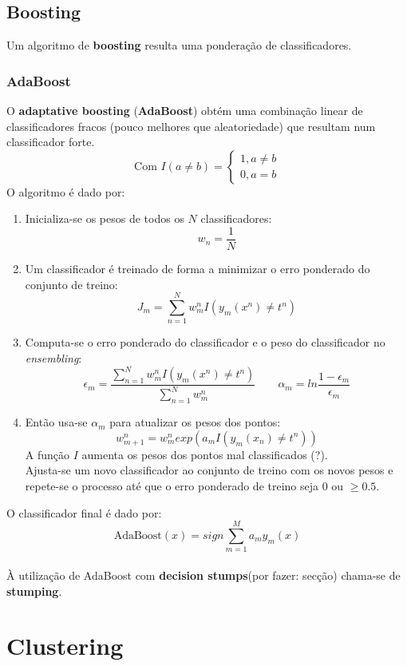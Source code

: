 \documentclass[]{report}
\begin{document}
\begin{minipage}{0.9\textwidth}
\section{Boosting}
Um algoritmo de \textbf{boosting} resulta uma ponderação de classificadores.
\subsection{AdaBoost}
O \textbf{adaptative boosting} (\textbf{AdaBoost}) obtém uma combinação linear de classificadores fracos (pouco melhores que aleatoriedade) que resultam num classificador forte.
$$\text{Com }
I(a \neq b) =
\begin{cases}
1 , a\neq b\\
0 , a=b
\end{cases}$$
O algoritmo é dado por:
\begin{enumerate}
\item Inicializa-se os pesos de todos os $N$ classificadores:
$$w_n = \frac{1}{N}$$
\item Um classificador é treinado de forma a minimizar o erro ponderado do conjunto de treino:
$$J_m = \sum_{n=1}^{N}w_m^n I(y_m(x^n)\neq t^n)$$
\item Computa-se o erro ponderado do classificador e o peso do classificador no \textit{ensembling}:
$$\epsilon_m = \frac{\sum\limits_{n=1}^N w_m^n I(y_m(x^n)\neq t^n)}{\sum\limits_{n=1}^N w_m^n} \quad \quad \alpha_m = ln \frac{1 - \epsilon_m}{\epsilon_m}$$
\item Então usa-se $\alpha_m$ para atualizar os pesos dos pontos:
$$w^n_{m+1} = w_m^n exp (a_m I(y_m(x_n) \neq t^n))$$
A função $I$ aumenta os pesos dos pontos mal classificados (?).\\
Ajusta-se um novo classificador ao conjunto de treino com os novos pesos e repete-se o processo até que o erro ponderado de treino seja 0 ou $\geq 0.5$.
\end{enumerate}
O classificador final é dado por:
$$\text{AdaBoost}(x) = sign \sum^M_{m=1} a_m y_m(x)$$\\[2mm]
À utilização de AdaBoost com \textbf{decision stumps}(por fazer: secção) chama-se de \textbf{stumping}.
\end{minipage}
\chapter{Clustering}
\end{document}
